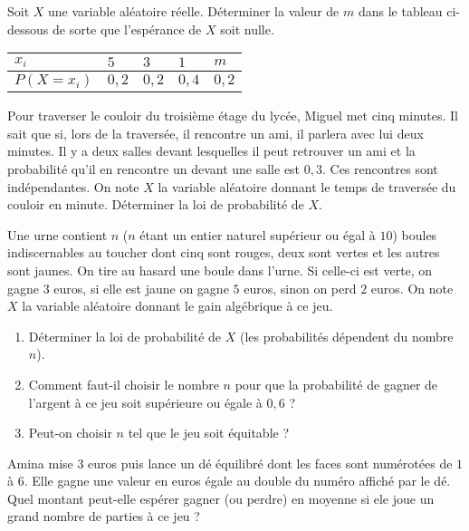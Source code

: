 \documentclass[11pt]{article}
\begin{document}
\begin{exo}
Soit $X$ une variable aléatoire réelle. Déterminer la
valeur de $m$ dans le tableau ci-dessous de sorte que l'espérance de $X$ soit
nulle.
\begin{center}
  \renewcommand{\arraystretch}{1.3}
  \begin{tabularx}{.7\textwidth}{|Y|Y|Y|Y|Y|}
    \hline
    $x_i$ & $5$ & $3$ & $1$ & $m$ \\
    \hline
    $P\left( X=x_i \right)$ & $0,2$ & $0,2$ & $0,4$ & $0,2$\\
    \hline
  \end{tabularx}
\end{center}
\end{exo}

\begin{exo}
  Pour traverser le couloir du troisième étage du lycée, Miguel met cinq
  minutes. Il sait que si, lors de la traversée, il rencontre un ami, il
  parlera avec lui deux minutes. Il y a deux salles devant lesquelles il peut
  retrouver un ami et la probabilité qu'il en rencontre un devant une salle est
  $0,3$. Ces rencontres sont indépendantes. On note $X$ la variable aléatoire
  donnant le temps de traversée du couloir en minute. Déterminer la loi de
  probabilité de $X$.
\end{exo}

\begin{exo}
  Une urne contient $n$ ($n$ étant un entier naturel supérieur ou égal à $10$)
  boules indiscernables au toucher dont cinq sont rouges, deux sont vertes et
  les autres sont jaunes. On tire au hasard une boule dans l'urne. Si celle-ci
  est verte, on gagne $3$ euros, si elle est jaune on gagne $5$ euros, sinon on
  perd $2$ euros. On note $X$ la variable aléatoire donnant le gain algébrique
  à ce jeu.
  \begin{enumerate}
    \item Déterminer la loi de probabilité de $X$ (les probabilités dépendent du
      nombre $n$).
    \item Comment faut-il choisir le nombre $n$ pour que la probabilité de
      gagner de l'argent à ce jeu soit supérieure ou égale à $0,6$ ?
    \item Peut-on choisir $n$ tel que le jeu soit équitable ?
  \end{enumerate}
\end{exo}

\begin{exo}
  Amina mise $3$ euros puis lance un dé équilibré dont les faces sont numérotées
  de $1$ à $6$. Elle gagne une valeur en euros égale au double du numéro affiché
  par le dé. Quel montant peut-elle espérer gagner (ou perdre) en moyenne si ele
  joue un grand nombre de parties à ce jeu ?
\end{exo}
\end{document}

